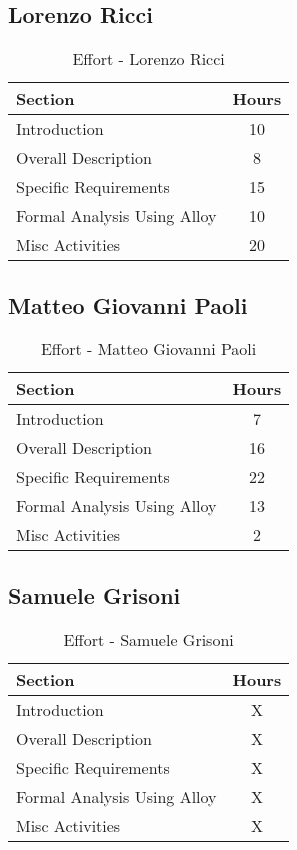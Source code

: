 \subsection*{Lorenzo Ricci}
\begin{table}[H]
    \centering
\begin{tabular}{|l|c|}
        \hline
        \textbf{Section} & \textbf{Hours} \\ \hline
        Introduction & 10 \\ \hline
        Overall Description & 8 \\ \hline
        Specific Requirements & 15\\ \hline
        Formal Analysis Using Alloy & 10 \\ \hline
        Misc Activities & 20 \\ \hline
    \end{tabular}
    \caption{Effort - Lorenzo Ricci}
    \label{tab:effotricci}
\end{table}
\subsection*{Matteo Giovanni Paoli}
\begin{table}[H]
    \centering
\begin{tabular}{|l|c|}
        \hline
        \textbf{Section} & \textbf{Hours} \\ \hline
        Introduction & 7 \\ \hline
        Overall Description & 16 \\ \hline
        Specific Requirements & 22\\ \hline
        Formal Analysis Using Alloy & 13 \\ \hline
        Misc Activities & 2 \\ \hline
    \end{tabular}
    \caption{Effort - Matteo Giovanni Paoli}
    \label{tab:effotricci}
\end{table}
\subsection*{Samuele Grisoni}
\begin{table}[H]
    \centering
\begin{tabular}{|l|c|}
        \hline
        \textbf{Section} & \textbf{Hours} \\ \hline
        Introduction & X \\ \hline
        Overall Description & X \\ \hline
        Specific Requirements & X\\ \hline
        Formal Analysis Using Alloy & X \\ \hline
        Misc Activities & X \\ \hline
    \end{tabular}
    \caption{Effort - Samuele Grisoni}
    \label{tab:effotricci}
\end{table}